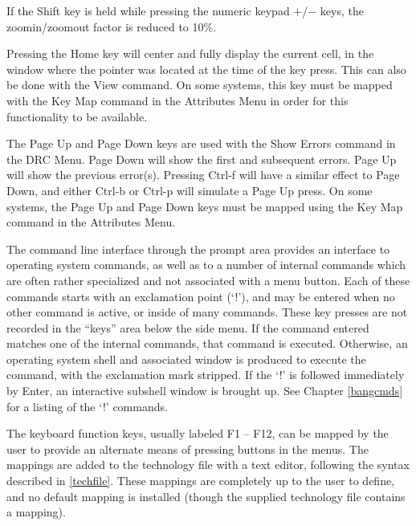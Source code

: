 If the {\kb Shift} key is held while pressing the numeric keypad {\kb
$+$}/{\kb $-$} keys, the zoomin/zoomout factor is reduced to 10\%.

Pressing the {\kb Home} key will center and fully display the current
cell, in the window where the pointer was located at the time of the
key press.  This can also be done with the {\cb View} command.  On
some systems, this key must be mapped with the {\cb Key Map} command
in the {\cb Attributes Menu} in order for this functionality to be
available.

The {\kb Page Up} and {\kb Page Down} keys are used with the {\cb Show
Errors} command in the {\cb DRC Menu}.  {\kb Page Down} will show the
first and subsequent errors.  {\kb Page Up} will show the previous
error(s).  Pressing {\kb Ctrl-f} will have a similar effect to {\kb
Page Down}, and either {\kb Ctrl-b} or {\kb Ctrl-p} will simulate a
{\kb Page Up} press.  On some systems, the {\kb Page Up} and {\kb Page
Down} keys must be mapped using the {\cb Key Map} command in the {\cb
Attributes Menu}.

The command line interface through the prompt area provides an
interface to operating system commands, as well as to a number of
internal commands which are often rather specialized and not
associated with a menu button.  Each of these commands starts with an
exclamation point (`{\kb !}'), and may be entered when no other
command is active, or inside of many commands.  These key presses are
not recorded in the ``keys'' area below the side menu.  If the command
entered matches one of the internal commands, that command is
executed.  Otherwise, an operating system shell and associated window
is produced to execute the command, with the exclamation mark
stripped.  If the `{\kb !}' is followed immediately by {\kb Enter}, an
interactive subshell window is brought up.  See Chapter \ref{bangcmds}
for a listing of the `{\kb !}' commands.

The keyboard function keys, usually labeled F1 -- F12, can be mapped
by the user to provide an alternate means of pressing buttons in the
menus.  The mappings are added to the technology file with a text
editor, following the syntax described in \ref{techfile}.  These
mappings are completely up to the user to define, and no default
mapping is installed (though the supplied technology file contains a
mapping).

